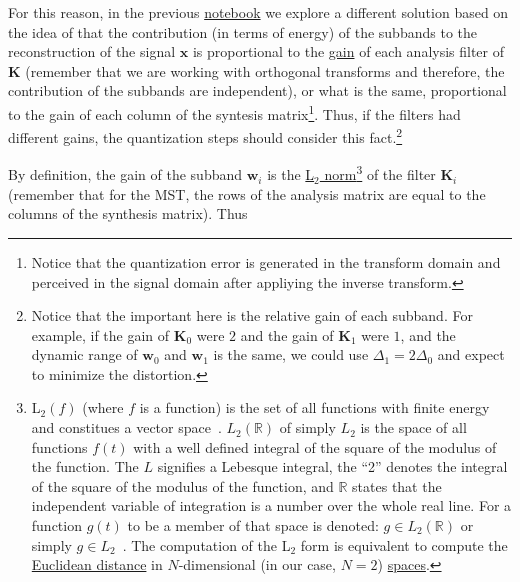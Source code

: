 For this reason, in the previous
\href{https://github.com/Tecnologias-multimedia/Tecnologias-multimedia.github.io/blob/master/study_guide/11-stereo_coding/stereo_transforms_RD.ipynb}{notebook}
we explore a different solution based on the idea of that the
contribution (in terms of energy) of the subbands to the
reconstruction of the signal ${\mathbf x}$ is proportional to the
\href{https://en.wikipedia.org/wiki/Filter_(signal_processing)}{gain}
of each analysis filter of ${\mathbf K}$ (remember that we are working
with orthogonal transforms and therefore, the contribution of the
subbands are independent), or what is the same, proportional to the gain of each
column of the syntesis matrix\footnote{Notice that the quantization
error is generated in the transform domain and perceived in the signal
domain after appliying the inverse transform.}. Thus, if the filters
had different gains, the quantization steps should consider this
fact.\footnote{Notice that the important here is the relative gain of
each subband. For example, if the gain of ${\mathbf K}_0$ were $2$ and
the gain of ${\mathbf K}_1$ were $1$, and the dynamic range of
${\mathbf w}_0$ and ${\mathbf w}_1$ is the same, we could use
$\Delta_1=2\Delta_0$ and expect to minimize the distortion.}

By definition, the gain of the subband ${\mathbf w}_i$ is the
\href{https://en.wikipedia.org/wiki/Lp_space}{L$_2$
  norm}\footnote{L$_2(f)$ (where $f$ is a function) is the set of all
functions with finite energy and constitues a vector
space~\cite{sayood2017introduction}. $L_2({\mathbb R})$ of simply
$L_2$ is the space of all functions $f(t)$ with a well defined
integral of the square of the modulus of the function. The $L$
signifies a Lebesque integral, the ``2'' denotes the integral of the
square of the modulus of the function, and ${\mathbb R}$ states that
the independent variable of integration is a number over the whole
real line. For a function $g(t)$ to be a member of that space is
denoted: $g\in L_2({\mathbb R})$ or simply $g\in
L_2$~\cite{burrus2013wavelets}. The computation of the L$_2$ form is
equivalent to compute the
\href{https://en.wikipedia.org/wiki/Euclidean_distance}{Euclidean
  distance} in $N$-dimensional (in our case, $N=2$)
\href{https://en.wikipedia.org/wiki/Vector_space}{spaces}.} of the
filter ${\mathbf K}_i$ (remember that for the MST, the rows of the
analysis matrix are equal to the columns of the synthesis
matrix). Thus

